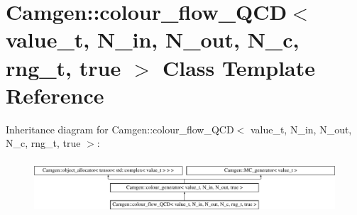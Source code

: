 \hypertarget{a00076}{}\section{Camgen\+:\+:colour\+\_\+flow\+\_\+\+Q\+C\+D$<$ value\+\_\+t, N\+\_\+in, N\+\_\+out, N\+\_\+c, rng\+\_\+t, true $>$ Class Template Reference}
\label{a00076}
Inheritance diagram for Camgen\+:\+:colour\+\_\+flow\+\_\+\+Q\+C\+D$<$ value\+\_\+t, N\+\_\+in, N\+\_\+out, N\+\_\+c, rng\+\_\+t, true $>$\+:\begin{figure}[H]
\begin{center}
\leavevmode
\includegraphics[height=2.019231cm]{a00076}
\end{center}
\end{figure}
